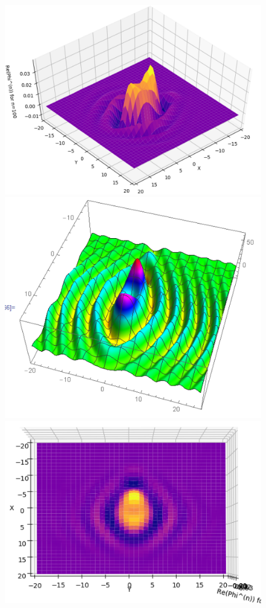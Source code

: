 \documentclass{article}
\theoremstyle{definition}
\begin{document}
\begin{figure}[!htb]
	\centering
	\includegraphics[scale=0.4]{conv}
	\includegraphics[scale=0.45]{conv-1}\\
	\includegraphics[scale=0.55]{conv-2}

\end{figure}
\end{document}
